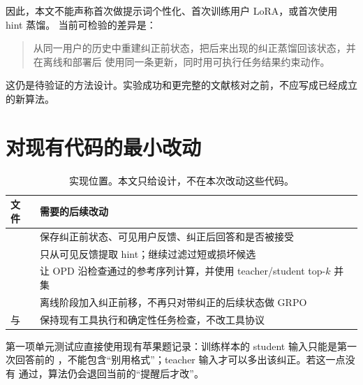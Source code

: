 \documentclass[11pt,UTF8,fontset=fandol]{ctexart}
\begin{document}
因此，本文不能声称首次做提示词个性化、首次训练用户 LoRA，或首次使用 hint 蒸馏。
当前可检验的差异是：
\begin{quote}
从同一用户的历史中重建纠正前状态，把后来出现的纠正蒸馏回该状态，并在离线和部署后
使用同一条更新，同时用可执行任务结果约束动作。
\end{quote}
这仍是待验证的方法设计。实验成功和更完整的文献核对之前，不应写成已经成立的新算法。

\section{对现有代码的最小改动}

\begin{table}[H]
  \centering
  \caption{实现位置。本文只给设计，不在本次改动这些代码。}
  \begin{tabularx}{\textwidth}{@{}L{0.27\textwidth}Y@{}}
    \toprule
    文件 & 需要的后续改动 \\
    \midrule
     &
    保存纠正前状态、可见用户反馈、纠正后回答和是否被接受 \\
     &
    只从可见反馈提取 hint；继续过滤过短或损坏候选 \\
     &
    让 OPD 沿检查通过的参考序列计算，并使用 teacher/student top-\(k\) 并集 \\
     &
    离线阶段加入纠正前移，不再只对带纠正的后续状态做 GRPO \\
     与  &
    保持现有工具执行和确定性任务检查，不改工具协议 \\
    \bottomrule
  \end{tabularx}
\end{table}

第一项单元测试应直接使用现有苹果题记录：训练样本的 student 输入只能是第一次回答前的
，不能包含``别用格式''；teacher 输入才可以多出该纠正。若这一点没有
通过，算法仍会退回当前的``提醒后才改''。
\end{document}
